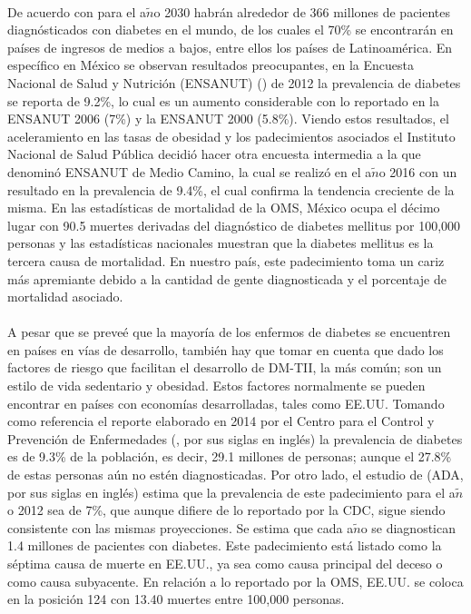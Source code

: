 \\
De acuerdo con \cite{bolanos2010costos} para el a$\tilde{n}$o 2030 habr\'an alrededor de 366 millones de pacientes diagn\'osticados con diabetes en el mundo, de los cuales el 70\% se encontrar\'an en pa\'ises de ingresos de medios a bajos, entre ellos los pa\'ises de Latinoam\'erica. En espec\'ifico en M\'exico se observan resultados preocupantes, en la Encuesta Nacional de Salud y Nutrici\'on (ENSANUT) (\cite{gutierrezencuesta}) de 2012 la prevalencia de diabetes se reporta de 9.2\%, lo cual es un aumento considerable con lo reportado en la ENSANUT 2006 (7\%) y la ENSANUT 2000 (5.8\%). Viendo estos resultados, el aceleramiento en las tasas de obesidad y los padecimientos asociados el Instituto Nacional de Salud P\'ublica decidi\'o hacer otra encuesta intermedia a la que denomin\'o ENSANUT de Medio Camino, la cual se realiz\'o en el a$\tilde{n}$o 2016 con un resultado en la prevalencia de 9.4\%, el cual confirma la tendencia creciente de la misma. En las estad\'isticas de mortalidad de la OMS, M\'exico ocupa el d\'ecimo lugar con 90.5 muertes derivadas del diagn\'ostico de diabetes mellitus por 100,000 personas y las estad\'isticas nacionales muestran que la diabetes mellitus es la tercera causa de mortalidad. En nuestro pa\'is, este padecimiento toma un cariz m\'as apremiante debido a la cantidad de gente diagnosticada y el porcentaje de mortalidad asociado.\\
\\
A pesar que se preve\'e que la mayor\'ia de los enfermos de diabetes se encuentren en pa\'ises en v\'ias de desarrollo, tambi\'en hay que tomar en cuenta que dado los factores de riesgo que facilitan el desarrollo de DM-TII, la m\'as com\'un; son un estilo de vida sedentario y obesidad. Estos factores normalmente se pueden encontrar en pa\'ises con econom\'ias desarrolladas, tales como EE.UU. Tomando como referencia el reporte elaborado en 2014 por el Centro para el Control y Prevenci\'on de Enfermedades (\cite{CDCStatistics}, por sus siglas en ingl\'es) la prevalencia de diabetes es de 9.3\% de la poblaci\'on, es decir, 29.1 millones de personas; aunque el 27.8\% de estas personas a\'un no est\'en diagnosticadas. Por otro lado, el estudio de \cite{american2013economic} (ADA, por sus siglas en ingl\'es) estima que la prevalencia de este padecimiento para el a$\tilde{n}$o 2012 sea de 7\%, que aunque difiere de lo reportado por la CDC, sigue siendo consistente con las mismas proyecciones. Se estima que cada a$\tilde{n}$o se diagnostican 1.4 millones de pacientes con diabetes. Este padecimiento est\'a listado como la s\'eptima causa de muerte en EE.UU., ya sea como causa principal del deceso o como causa subyacente. En relaci\'on a lo reportado por la OMS, EE.UU. se coloca en la posici\'on 124 con 13.40 muertes entre 100,000 personas. \\
